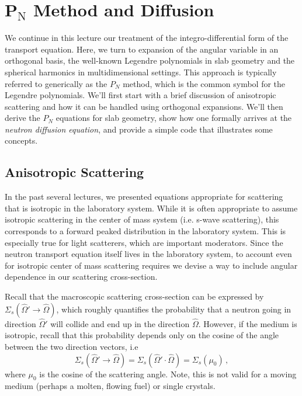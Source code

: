 \chapter{P$\mathrm{_N}$ Method and Diffusion}
\label{lec:pn_method_and_diffusion}

We continue in this lecture our treatment of the integro-differential form of 
the transport equation.  Here, we turn to expansion of the angular variable in 
an orthogonal basis, the well-known Legendre polynomials in slab geometry and 
the spherical harmonics in multidimensional settings.  This approach is 
typically referred to generically as the $P_N$ method, which is the common 
symbol for the Legendre polynomials.  We'll first start with a brief discussion 
of anisotropic scattering and how it can be handled using orthogonal expansions. 
 We'll then derive the $P_N$ equations for slab geometry, show how one formally 
arrives at the \textit{neutron diffusion equation}, and provide a simple code 
that illustrates some concepts.

\section*{Anisotropic Scattering}

In the past several lectures, we presented equations appropriate for scattering 
that is isotropic in the laboratory system.  While it is often appropriate to 
assume isotropic scattering in the center of mass system (i.e. s-wave 
scattering), this corresponds to a forward peaked distribution in the laboratory 
system.  This is especially true for light scatterers, which are important 
moderators.  Since the neutron transport equation itself lives in the laboratory 
system, to account even for isotropic center of mass scattering requires we 
devise a way to include angular dependence in our scattering cross-section.

Recall that the macroscopic scattering cross-section can be expressed by 
$\Sigma_s(\hat{\Omega}' \to \hat{\Omega})$, which roughly quantifies the 
probability that a neutron going in direction $\hat{\Omega}'$ will collide and 
end up in the direction $\hat{\Omega}$.  However, if the medium is isotropic, 
recall that this probability depends only on the cosine of the angle between the 
two direction vectors, i.e 
\begin{equation}
 \Sigma_s(\hat{\Omega}' \to \hat{\Omega}) = \Sigma_s(\hat{\Omega}' \cdot 
\hat{\Omega}) = \Sigma_s(\mu_0) \, ,
\end{equation}
where $\mu_0$ is the cosine of the scattering angle.  Note, this is not valid 
for a moving medium (perhaps a molten, flowing fuel) or single crystals.

